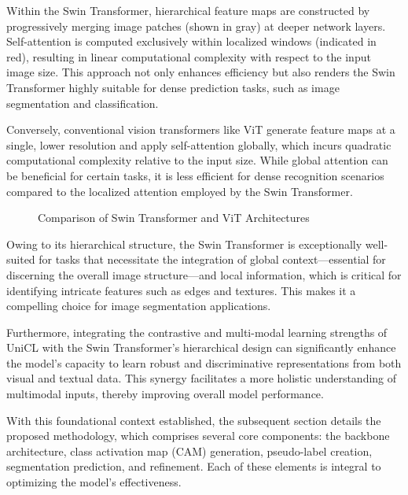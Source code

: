 Within the Swin Transformer, hierarchical feature maps are constructed by progressively merging image patches (shown in gray) at deeper network layers. Self-attention is computed exclusively within localized windows (indicated in red), resulting in linear computational complexity with respect to the input image size. This approach not only enhances efficiency but also renders the Swin Transformer highly suitable for dense prediction tasks, such as image segmentation and classification.

Conversely, conventional vision transformers like ViT generate feature maps at a single, lower resolution and apply self-attention globally, which incurs quadratic computational complexity relative to the input size. While global attention can be beneficial for certain tasks, it is less efficient for dense recognition scenarios compared to the localized attention employed by the Swin Transformer.

\begin{figure}[htbp]
    \centering
    \caption{Comparison of Swin Transformer and ViT Architectures}
    \label{fig:swin_vs_vit_architecture}
\end{figure}

Owing to its hierarchical structure, the Swin Transformer is exceptionally well-suited for tasks that necessitate the integration of global context—essential for discerning the overall image structure—and local information, which is critical for identifying intricate features such as edges and textures. This makes it a compelling choice for image segmentation applications.

Furthermore, integrating the contrastive and multi-modal learning strengths of UniCL with the Swin Transformer’s hierarchical design can significantly enhance the model’s capacity to learn robust and discriminative representations from both visual and textual data. This synergy facilitates a more holistic understanding of multimodal inputs, thereby improving overall model performance.

With this foundational context established, the subsequent section details the proposed methodology, which comprises several core components: the backbone architecture, class activation map (CAM) generation, pseudo-label creation, segmentation prediction, and refinement. Each of these elements is integral to optimizing the model’s effectiveness.